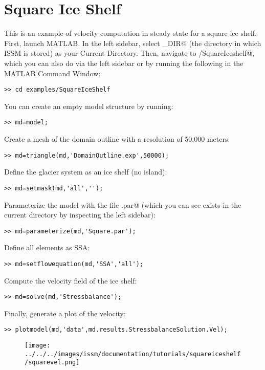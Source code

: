 \section{Square Ice Shelf}
This is an example of velocity computation in steady state for a square ice shelf. First, launch MATLAB. In the left sidebar, select \verb@ISSM_DIR@ (the directory in which ISSM is stored) as your Current Directory. Then, navigate to \verb@examples/SquareIceshelf@, which you can also do via the left sidebar or by running the following in the MATLAB Command Window:
\begin{verbatim}>> cd examples/SquareIceShelf\end{verbatim}

You can create an empty model structure by running:
\begin{verbatim}>> md=model;\end{verbatim}

Create a mesh of the domain outline with a resolution of 50,000 meters:
\begin{verbatim}>> md=triangle(md,'DomainOutline.exp',50000);\end{verbatim}

Define the glacier system as an ice shelf (no island):
\begin{verbatim}>> md=setmask(md,'all','');\end{verbatim}

Parameterize the model with the file \verb@Square.par@ (which you can see exists in the current directory by inspecting the left sidebar):
\begin{verbatim}>> md=parameterize(md,'Square.par');\end{verbatim}

Define all elements as SSA:
\begin{verbatim}>> md=setflowequation(md,'SSA','all');\end{verbatim}

Compute the velocity field of the ice shelf:
\begin{verbatim}>> md=solve(md,'Stressbalance');\end{verbatim}

Finally, generate a plot of the velocity:
\begin{verbatim}>> plotmodel(md,'data',md.results.StressbalanceSolution.Vel);\end{verbatim}

\begin{figure}[H]
	\begin{center}
		\texttt{[image: ../../../images/issm/documentation/tutorials/squareiceshelf/squarevel.png]}
	\end{center}
\end{figure}
